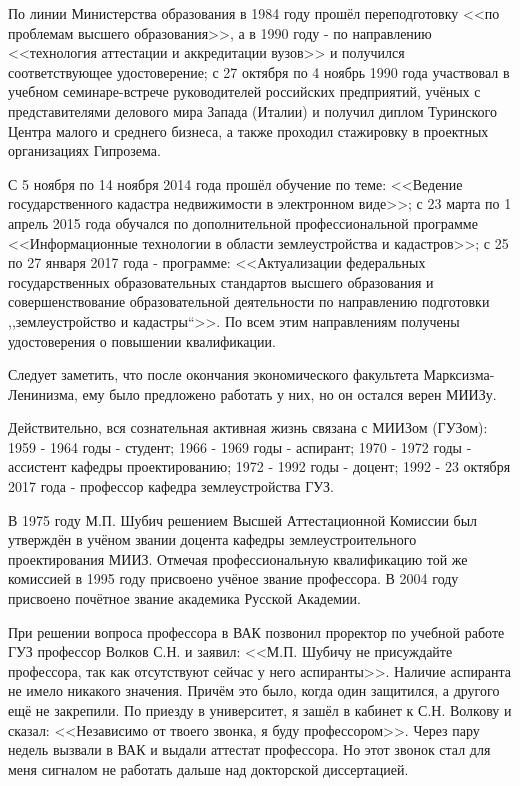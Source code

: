 По линии Министерства образования в 1984 году прошёл переподготовку <<по проблемам высшего образования>>, а в 1990 году - по направлению <<технология аттестации и аккредитации вузов>> и получился соответствующее удостоверение; с 27 октября по 4 ноябрь 1990 года участвовал в учебном семинаре-встрече руководителей российских предприятий, учёных с представителями делового мира Запада (Италии) и получил диплом Туринского Центра малого и среднего бизнеса, а также проходил стажировку в проектных организациях Гипрозема.

С 5 ноября по 14 ноября 2014 года прошёл обучение по теме: <<Ведение государственного кадастра недвижимости в электронном виде>>; с 23 марта по 1 апрель 2015 года обучался по дополнительной профессиональной программе <<Информационные технологии в области землеустройства и кадастров>>; с 25 по 27 января 2017 года - программе: <<Актуализации федеральных государственных образовательных стандартов высшего образования и совершенствование образовательной деятельности по направлению подготовки ,,землеустройство и кадастры``>>. По всем этим направлениям получены удостоверения о повышении квалификации. 

Следует заметить, что после окончания экономического факультета Марксизма-Ленинизма, ему было предложено работать у них, но он остался верен МИИЗу.

Действительно, вся сознательная активная жизнь связана с МИИЗом (ГУЗом): 1959 - 1964 годы - студент; 1966 - 1969 годы - аспирант; 1970 - 1972 годы - ассистент кафедры проектированию; 1972 - 1992 годы - доцент; 1992 - 23 октября 2017 года - профессор кафедра землеустройства ГУЗ.

В 1975 году М.П. Шубич решением Высшей Аттестационной Комиссии был утверждён в учёном звании доцента кафедры землеустроительного проектирования МИИЗ. Отмечая профессиональную квалификацию той же комиссией в 1995 году присвоено учёное звание профессора. В 2004 году присвоено почётное звание академика Русской Академии.

При решении вопроса профессора в ВАК позвонил проректор по учебной работе ГУЗ профессор Волков С.Н. и заявил: <<М.П. Шубичу не присуждайте профессора, так как отсутствуют сейчас у него аспиранты>>. Наличие аспиранта не имело никакого значения. Причём это было, когда один защитился, а другого ещё не закрепили. По приезду в университет, я зашёл в кабинет к С.Н. Волкову и сказал: <<Независимо от твоего звонка, я буду профессором>>. Через пару недель вызвали в ВАК и выдали аттестат профессора. Но этот звонок стал для меня сигналом не работать дальше над докторской диссертацией.

